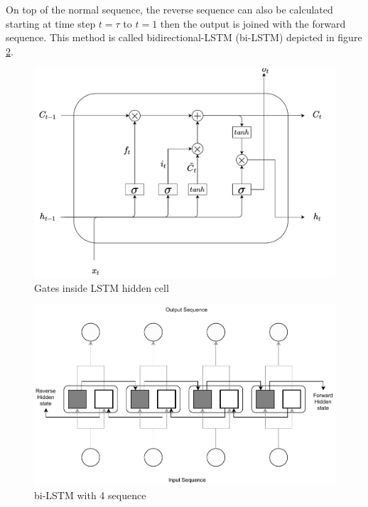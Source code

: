     On top of the normal sequence, the reverse sequence can also be
    calculated starting at time step $t=\tau$ to $t = 1$ then the
    output is joined with the forward sequence. This method is called
    bidirectional-LSTM (bi-LSTM) depicted in figure \ref{fig:bilstm}.
    
    \begin{figure}
        \centering
        \includegraphics[width=.6\linewidth]{images/lstm.pdf}
        \caption{Gates inside LSTM hidden cell}
        \label{fig:lstm}
    \end{figure}

    \begin{figure}[H]
        \centering
        \includegraphics[width=.8\linewidth]{images/bi-lstm.pdf}
        \caption{bi-LSTM with 4 sequence}
        \label{fig:bilstm}
    \end{figure}


